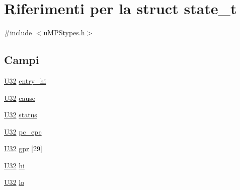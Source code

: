 \hypertarget{structstate__t}{\section{Riferimenti per la struct state\-\_\-t}
\label{structstate__t}
}


{\ttfamily \#include $<$u\-M\-P\-Stypes.\-h$>$}

\subsection*{Campi}
\begin{DoxyCompactItemize}
\item 
\hyperlink{lib_2base_8h_ac3df7cf3c8cb172a588adec881447d68}{U32} \hyperlink{structstate__t_a867e8a3789b0868e6fe3cb734b8d7e34}{entry\-\_\-hi}
\item 
\hyperlink{lib_2base_8h_ac3df7cf3c8cb172a588adec881447d68}{U32} \hyperlink{structstate__t_a977139f16407ef0c648e940dabe05318}{cause}
\item 
\hyperlink{lib_2base_8h_ac3df7cf3c8cb172a588adec881447d68}{U32} \hyperlink{structstate__t_ae37efb991e613c0dc476ece5ed4ffa71}{status}
\item 
\hyperlink{lib_2base_8h_ac3df7cf3c8cb172a588adec881447d68}{U32} \hyperlink{structstate__t_ac0cfee10c7a13bb3749604cd15892217}{pc\-\_\-epc}
\item 
\hyperlink{lib_2base_8h_ac3df7cf3c8cb172a588adec881447d68}{U32} \hyperlink{structstate__t_a42033ce9f27270ef281d89603922dcab}{gpr} \mbox{[}29\mbox{]}
\item 
\hyperlink{lib_2base_8h_ac3df7cf3c8cb172a588adec881447d68}{U32} \hyperlink{structstate__t_a0e34aeb4eba44f3971bb1bf383435897}{hi}
\item 
\hyperlink{lib_2base_8h_ac3df7cf3c8cb172a588adec881447d68}{U32} \hyperlink{structstate__t_a55f6b3c956fb70c8ef13c4a00ccd3a7b}{lo}
\end{DoxyCompactItemize}


